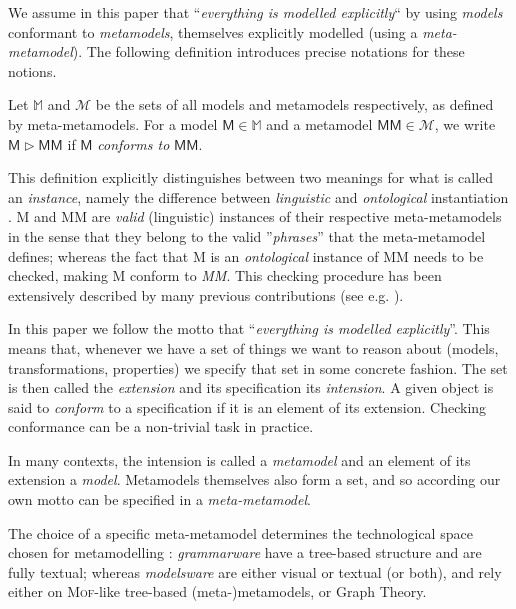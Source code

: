 \begin{olddef}
We assume in this paper that ``\emph{everything is modelled explicitly}`` by 
using \emph{models} conformant to \emph{metamodels}, themselves explicitly 
modelled (using a \emph{meta-metamodel}). The following definition introduces 
precise notations for these notions.

\begin{Definition}
   Let $\mathbb{M}$ and $\mathcal{M}$ be the sets of all models and metamodels 
respectively, as defined by meta-metamodels. For a model $\mathsf{M} \in 
\mathbb{M}$ and a metamodel $\mathsf{MM} \in \mathcal{M}$, we write $\mathsf{M} 
\rhd \mathsf{MM}$ if $\mathsf{M}$ \emph{conforms to} $\mathsf{MM}$.
\end{Definition}
This definition explicitly distinguishes between two meanings for what is 
called an \emph{instance}, namely the difference between \emph{linguistic} and 
\emph{ontological} instantiation \cite{J:Kuhne:2006}. \textsf{M} and \textsf{MM} 
are \emph{valid} (linguistic) instances of their respective meta-metamodels in 
the sense that they belong to the valid ''\emph{phrases}'' that the 
meta-metamodel defines; whereas the fact that \textsf{M} is an 
\emph{ontological} instance of \textsf{MM} needs to be checked, making 
\textsf{M} conform to \emph{MM}. This checking procedure has been extensively 
described by many previous contributions (see e.g. 
\cite{PhD:Amrani:2013,J:Rivera-Duran-Vallecillo:2009}).
\end{olddef}
\begin{newdef}
In this paper we follow the motto that ``\emph{everything is modelled explicitly}''. This means that, whenever we have a set of things we want to reason about (models, transformations, properties) we specify that set in some concrete fashion. The set is then called the \emph{extension} and its specification its \emph{intension}. A given object is said to \emph{conform} to a specification if it is an element of its extension. Checking conformance can be a non-trivial task in practice.

In many contexts, the intension is called a \emph{metamodel} and an element of its extension a \emph{model}. Metamodels themselves also form a set, and so according our own motto can be specified in a \emph{meta-metamodel}. 
\end{newdef}

The choice of a specific meta-metamodel determines the technological space 
chosen for metamodelling \cite{Wimmer-Kramler:2005}: \emph{grammarware} have a 
tree-based structure and are fully textual; whereas \emph{modelsware} are either 
visual or textual (or both), and rely either on \textsc{Mof}-like tree-based 
(meta-)metamodels, or Graph Theory. 


